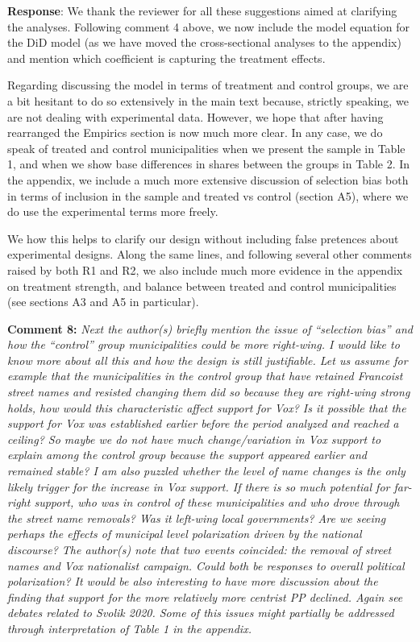 \documentclass[12pt, a4paper, notitlepage]{article}
\begin{document}
\textbf{Response}: We thank the reviewer for all these suggestions aimed at clarifying the analyses. Following comment 4 above, we now include the model equation for the DiD model (as we have moved the cross-sectional analyses to the appendix) and mention which coefficient is capturing the treatment effects.

Regarding discussing the model in terms of treatment and control groups, we are a bit hesitant to do so extensively in the main text because, strictly speaking, we are not dealing with experimental data. However, we hope that after having rearranged the Empirics section is now much more clear.
In any case, we do speak of treated and control municipalities when we present the sample in Table 1, and when we show base differences in shares between the groups in Table 2.
In the appendix, we include a much more extensive discussion of selection bias both in terms of inclusion in the sample and treated vs control (section A5), where we do use the experimental terms more freely.

We how this helps to clarify our design without including false pretences about experimental designs. Along the same lines, and following several other comments raised by both R1 and R2, we also include much more evidence in the appendix on treatment strength, and balance between treated and control municipalities (see sections A3 and A5 in particular).

\textbf{Comment 8:} \textit{Next the author(s) briefly mention the issue of “selection bias” and how the “control” group municipalities could be more right-wing. I would like to know more about all this and how the design is still justifiable.
Let us assume for example that the municipalities in the control group that have retained Francoist street names and resisted changing them did so because they are right-wing strong holds, how would this characteristic affect support for Vox? Is it possible that the support for Vox was established earlier before the period analyzed and reached a ceiling? So maybe we do not have much change/variation in Vox support to explain among the control group because the support appeared earlier and remained stable?
I am also puzzled whether the level of name changes is the only likely trigger for the increase in Vox support. If there is so much potential for far-right support, who was in control of these municipalities and who drove through the street name removals? Was it left-wing local governments? Are we seeing perhaps the effects of municipal level polarization driven by the national discourse?
The author(s) note that two events coincided: the removal of street names and Vox nationalist campaign.  Could both be responses to overall political polarization? It would be also interesting to have more discussion about the finding that support for the more relatively more centrist PP declined. Again see debates related to Svolik 2020. Some of this issues might partially be addressed through interpretation of Table 1 in the appendix.}
\end{document}
